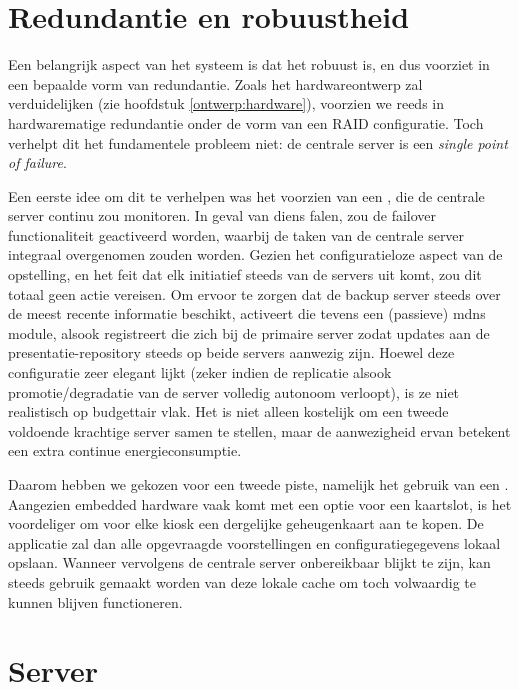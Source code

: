 \documentclass[verslag.tex]{subfiles}
\begin{document}
\section{Redundantie en robuustheid}
\label{sec:redundantie}

Een belangrijk aspect van het systeem is dat het robuust is, en dus voorziet in een bepaalde vorm van redundantie. Zoals het hardwareontwerp zal verduidelijken (zie hoofdstuk \ref{ontwerp:hardware}), voorzien we reeds in hardwarematige redundantie onder de vorm van een RAID configuratie. Toch verhelpt dit het fundamentele probleem niet: de centrale server is een \emph{single point of failure}.

Een eerste idee om dit te verhelpen was het voorzien van een , die de centrale server continu zou monitoren. In geval van diens falen, zou de failover functionaliteit geactiveerd worden, waarbij de taken van de centrale server integraal overgenomen zouden worden. Gezien het configuratieloze aspect van de opstelling, en het feit dat elk initiatief steeds van de servers uit komt, zou dit totaal geen actie vereisen. Om ervoor te zorgen dat de backup server steeds over de meest recente informatie beschikt, activeert die tevens een (passieve) \ac{mdns} module, alsook registreert die zich bij de primaire server zodat updates aan de presentatie-repository steeds op beide servers aanwezig zijn.
Hoewel deze configuratie zeer elegant lijkt (zeker indien de replicatie alsook promotie/degradatie van de server volledig autonoom verloopt), is ze niet realistisch op budgettair vlak. Het is niet alleen kostelijk om een tweede voldoende krachtige server samen te stellen, maar de aanwezigheid ervan betekent een extra continue energieconsumptie.

Daarom hebben we gekozen voor een tweede piste, namelijk het gebruik van een . Aangezien embedded hardware vaak komt met een optie voor een kaartslot, is het voordeliger om voor elke kiosk een dergelijke geheugenkaart aan te kopen. De applicatie zal dan alle opgevraagde voorstellingen en configuratiegegevens lokaal opslaan. Wanneer vervolgens de centrale server onbereikbaar blijkt te zijn, kan steeds gebruik gemaakt worden van deze lokale cache om toch volwaardig te kunnen blijven functioneren.

\section{Server}
\label{ontwerp:applicatie:server}
\end{document}
